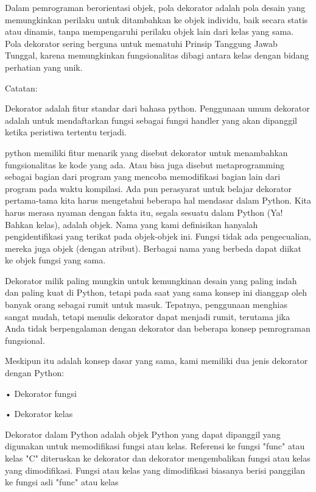 Dalam pemrograman berorientasi objek, pola dekorator adalah pola desain yang memungkinkan perilaku untuk ditambahkan ke objek individu, baik secara statis atau dinamis, tanpa mempengaruhi perilaku objek lain dari kelas yang sama. Pola dekorator sering berguna untuk mematuhi Prinsip Tanggung Jawab Tunggal, karena memungkinkan fungsionalitas dibagi antara kelas dengan bidang perhatian yang unik.



Catatan:

Dekorator adalah fitur standar dari bahasa python. Penggunaan umum dekorator adalah untuk mendaftarkan fungsi sebagai fungsi handler yang akan dipanggil ketika peristiwa tertentu terjadi.



python memiliki fitur menarik yang disebut dekorator untuk menambahkan fungsionalitas ke kode yang ada. Atau bisa juga disebut metaprogramming sebagai bagian dari program yang mencoba memodifikasi bagian lain dari program pada waktu kompilasi. Ada pun perasyarat untuk belajar dekorator pertama-tama kita harus mengetahui beberapa hal mendasar dalam Python. Kita harus merasa nyaman dengan fakta itu, segala sesuatu dalam Python (Ya! Bahkan kelas), adalah objek. Nama yang kami definisikan hanyalah pengidentifikasi yang terikat pada objek-objek ini. Fungsi tidak ada pengecualian, mereka juga objek (dengan atribut). Berbagai nama yang berbeda dapat diikat ke objek fungsi yang sama.



Dekorator milik paling mungkin untuk kemungkinan desain yang paling indah dan paling kuat di Python, tetapi pada saat yang sama konsep ini dianggap oleh banyak orang sebagai rumit untuk masuk. Tepatnya, penggunaan menghias sangat mudah, tetapi menulis dekorator dapat menjadi rumit, terutama jika Anda tidak berpengalaman dengan dekorator dan beberapa konsep pemrograman fungsional. 



Meskipun itu adalah konsep dasar yang sama, kami memiliki dua jenis dekorator dengan Python:

•	Dekorator fungsi

•	Dekorator kelas

Dekorator dalam Python adalah objek Python yang dapat dipanggil yang digunakan untuk memodifikasi fungsi atau kelas. Referensi ke fungsi "func" atau kelas "C" diteruskan ke dekorator dan dekorator mengembalikan fungsi atau kelas yang dimodifikasi. Fungsi atau kelas yang dimodifikasi biasanya berisi panggilan ke fungsi asli "func" atau kelas 

